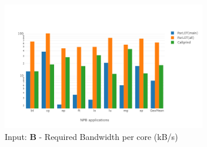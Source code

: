 \begin{figure}[!t]
\centering
\includegraphics[width=3.5in]{figs.comet.newMed/comet_chartAvg_bw_B_p3_5.png}
\caption{ Input: \textbf{B} - Required Bandwidth per core (kB/s)
}
\label{comet_chartAvg_bw_B_p3_5}
\end{figure}



